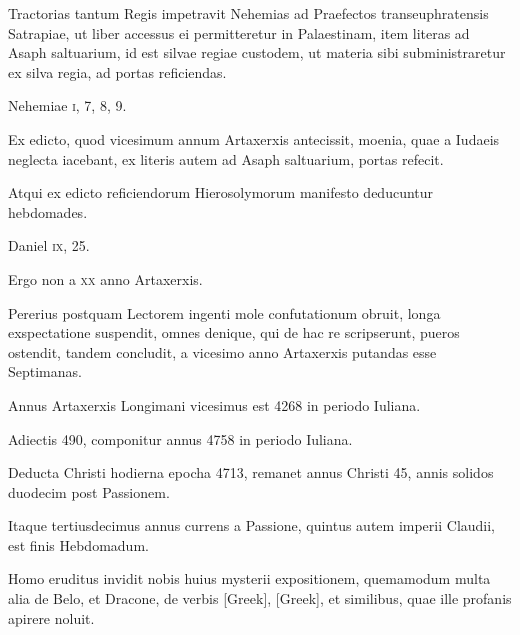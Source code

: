 \begin{parnumbers}
Tractorias tantum Regis impetravit Nehemias ad Praefectos
transeuphratensis Satrapiae, ut liber accessus ei permitteretur
in Palaestinam, item literas ad Asaph saltuarium, id est silvae regiae
custodem, ut materia sibi subministraretur ex silva regia, ad
portas reficiendas.

Nehemiae \textsc{i}, 7, 8, 9.

Ex edicto, quod vicesimum
annum Artaxerxis antecissit, moenia, quae a Iudaeis neglecta
iacebant, ex literis autem ad Asaph saltuarium, portas refecit.

Atqui ex edicto reficiendorum Hierosolymorum manifesto deducuntur
hebdomades.

Daniel \textsc{ix}, 25.

Ergo non a \textsc{xx} anno Artaxerxis.

Pererius postquam Lectorem ingenti mole confutationum
obruit, longa exspectatione suspendit, omnes denique, qui
de hac re scripserunt, pueros ostendit, tandem concludit, a vicesimo
anno Artaxerxis putandas esse Septimanas.

Annus Artaxerxis
Longimani vicesimus est 4268 in periodo Iuliana.

Adiectis 490,
componitur annus 4758 in periodo Iuliana.

Deducta Christi hodierna
epocha 4713, remanet annus Christi 45, annis solidos duodecim
post Passionem.

Itaque tertiusdecimus annus currens a Passione,
quintus autem imperii Claudii, est finis Hebdomadum.

Homo eruditus invidit nobis huius mysterii expositionem, quemamodum
multa alia de Belo, et Dracone, de verbis \textgreek{[Greek]},
\textgreek{[Greek]}, et similibus, quae ille profanis apirere noluit.


\end{parnumbers}
